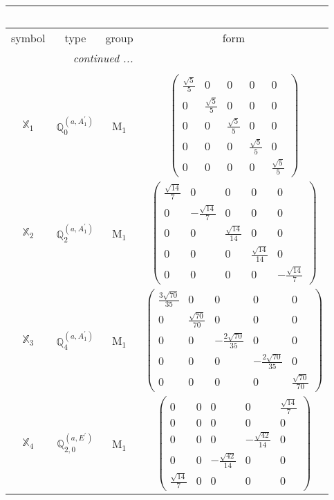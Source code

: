 \documentclass[fleqn,10pt,landscape]{article}
\begin{document}
\begin{itemize}
\begin{center}
\begin{longtable}{c|c|c|c}
\multicolumn{3}{l}{\tablename\ \thetable{}} \\
 \hline \hline
symbol & type & group & form \\ \hline \endhead

 \hline \hline
\multicolumn{3}{r}{\footnotesize\it continued ...} \\ \endfoot

 \hline \hline
\multicolumn{3}{r}{} \\ \endlastfoot

$ \mathbb{X}_{1} $ & $\mathbb{Q}_{0}^{(a,A_{1}^{\prime})}$ & M$_{1}$ & $\begin{pmatrix} \frac{\sqrt{5}}{5} & 0 & 0 & 0 & 0 \\ 0 & \frac{\sqrt{5}}{5} & 0 & 0 & 0 \\ 0 & 0 & \frac{\sqrt{5}}{5} & 0 & 0 \\ 0 & 0 & 0 & \frac{\sqrt{5}}{5} & 0 \\ 0 & 0 & 0 & 0 & \frac{\sqrt{5}}{5} \end{pmatrix}$ \\
$ \mathbb{X}_{2} $ & $\mathbb{Q}_{2}^{(a,A_{1}^{\prime})}$ & M$_{1}$ & $\begin{pmatrix} \frac{\sqrt{14}}{7} & 0 & 0 & 0 & 0 \\ 0 & - \frac{\sqrt{14}}{7} & 0 & 0 & 0 \\ 0 & 0 & \frac{\sqrt{14}}{14} & 0 & 0 \\ 0 & 0 & 0 & \frac{\sqrt{14}}{14} & 0 \\ 0 & 0 & 0 & 0 & - \frac{\sqrt{14}}{7} \end{pmatrix}$ \\
$ \mathbb{X}_{3} $ & $\mathbb{Q}_{4}^{(a,A_{1}^{\prime})}$ & M$_{1}$ & $\begin{pmatrix} \frac{3 \sqrt{70}}{35} & 0 & 0 & 0 & 0 \\ 0 & \frac{\sqrt{70}}{70} & 0 & 0 & 0 \\ 0 & 0 & - \frac{2 \sqrt{70}}{35} & 0 & 0 \\ 0 & 0 & 0 & - \frac{2 \sqrt{70}}{35} & 0 \\ 0 & 0 & 0 & 0 & \frac{\sqrt{70}}{70} \end{pmatrix}$ \\
$ \mathbb{X}_{4} $ & $\mathbb{Q}_{2,0}^{(a,E^{\prime})}$ & M$_{1}$ & $\begin{pmatrix} 0 & 0 & 0 & 0 & \frac{\sqrt{14}}{7} \\ 0 & 0 & 0 & 0 & 0 \\ 0 & 0 & 0 & - \frac{\sqrt{42}}{14} & 0 \\ 0 & 0 & - \frac{\sqrt{42}}{14} & 0 & 0 \\ \frac{\sqrt{14}}{7} & 0 & 0 & 0 & 0 \end{pmatrix}$ \\

\end{longtable}
\end{center}
\end{itemize}
\end{document}
